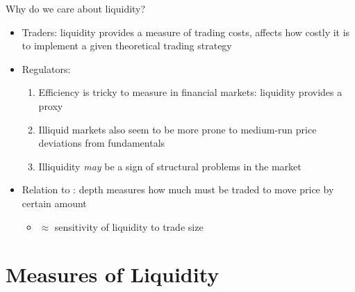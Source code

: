 \documentclass[english,10pt
,aspectratio=169
]{beamer}
\begin{document}
\begin{frame}{Why do we care about liquidity?}
\begin{itemize}
	\item Traders: liquidity provides a measure of trading costs, affects how costly it is to implement a given theoretical trading strategy
	\item Regulators:
	\begin{enumerate}
		\item Efficiency is tricky to measure in financial markets: liquidity provides a proxy
		\item Illiquid markets also seem to be more prone to medium-run price deviations from fundamentals
		\item Illiquidity \textit{may} be a sign of structural problems in the market
	\end{enumerate}
	\item Relation to : depth measures how much must be traded to move price by certain amount
	\begin{itemize}
		\item $\approx$ sensitivity of liquidity to trade size
	\end{itemize}
\end{itemize}
\end{frame}





\section{Measures of Liquidity}
\end{document}
